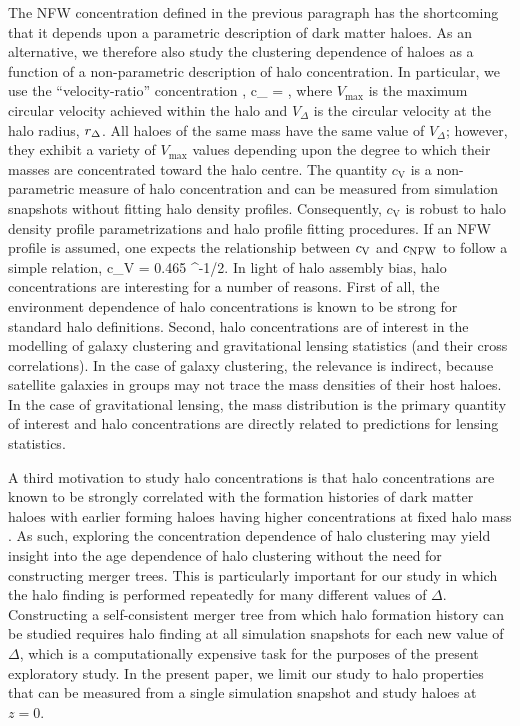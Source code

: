 \documentclass[usenatbib,fleqn]{mnras}
\begin{document}
The NFW concentration defined in the previous paragraph has the shortcoming that it depends upon a parametric description of dark matter haloes. As an alternative, we therefore also study the clustering dependence of haloes as a function of a non-parametric description of halo concentration. In particular, we use the ``velocity-ratio'' concentration \citep{prada_etal12,klypin_etal16},
%
\beq
c_{} = , 
\eeq
%
where $V_{\mathrm{max}}$ is the maximum circular velocity achieved within the halo and $V_{\Delta}$ is the circular velocity at the halo radius, $r_{\Delta}$. All haloes of the same mass have the same value of $V_{\Delta}$; however, they exhibit a variety of $V_{\mathrm{max}}$ values depending upon the degree to which their masses are concentrated toward the halo centre. The quantity $c_{\mathrm{V}}$ is a non-parametric measure of halo concentration and can be measured from simulation snapshots without fitting halo density profiles. Consequently, $c_{\mathrm{V}}$ is robust to halo density profile parametrizations and halo profile fitting procedures. If an NFW profile is assumed, one expects the relationship between $c_{\rm V}$ and $c_{\rm NFW}$ to follow a simple relation,
%
\beq
c_{\rm V} = 0.465 ^{-1/2}.
\eeq
%
In light of halo assembly bias, halo concentrations are interesting for a number of reasons. First of all, the environment dependence of halo concentrations is known to be strong for standard halo definitions. Second, halo concentrations are of interest in the modelling of galaxy clustering and gravitational lensing statistics (and their cross correlations). In the case of galaxy clustering, the relevance is indirect, because satellite galaxies in groups may not trace the mass densities of their host haloes. In the case of gravitational lensing, the mass distribution is the primary quantity of interest and halo concentrations are directly related to predictions for lensing statistics.

A third motivation to study halo concentrations is that halo concentrations are known to be strongly correlated with the formation histories of dark matter haloes with earlier forming haloes having higher concentrations at fixed halo mass \citep{wechsler_etal02, zhao_etal03, wechsler_etal06, zhao_etal09}. As such, exploring the concentration dependence of halo clustering may yield insight into the age dependence of halo clustering without the need for constructing merger trees. This is particularly important for our study in which the halo finding is performed repeatedly for many different values of $\Delta$. Constructing a self-consistent merger tree from which halo formation history can be studied requires halo finding at all simulation snapshots for each new value of $\Delta$, which is a computationally expensive task for the purposes of the present exploratory study. In the present paper, we limit our study to halo properties that can be measured from a single simulation snapshot and study haloes at $z=0$. 
\end{document}
